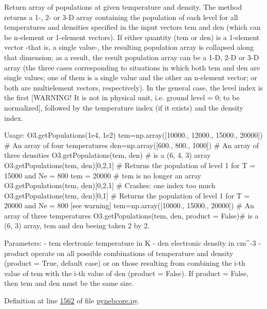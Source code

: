 \begin{DoxyVerb}Return array of populations at given temperature and density.
The method returns a 1-, 2- or 3-D array containing the population of each level 
    for all temperatures and densities specified in the input vectors tem and den 
    (which can be n-element or 1-element vectors).
If either quantity (tem or den) is a 1-element vector -that is, a single value-, 
    the resulting population array is collapsed along that dimension; 
    as a result, the result population array can be a 1-D, 2-D or 3-D array 
    (the three cases corresponding to situations in which both tem and den are single values; 
    one of them is a single value and the other an n-element vector; or both are multielement 
    vectors, respectively). In the general case, the level index is the first 
    [WARNING! It is not in physical unit, i.e. ground level = 0; to be normalized], 
    followed by the temperature index (if it exists) and the density index. 

Usage:
    O3.getPopulations(1e4, 1e2)
    tem=np.array([10000., 12000., 15000., 20000]) # An array of four temperatures
    den=np.array([600., 800., 1000])      # An array of three densities
    O3.getPopulations(tem, den)           # is a (6, 4, 3) array
    O3.getPopulations(tem, den)[0,2,1]    # Returns the population of level 1 for T = 15000 
                                    and Ne = 800
    tem = 20000                           # tem is no longer an array
    O3.getPopulations(tem, den)[0,2,1]  # Crashes: one index too much
    O3.getPopulations(tem, den)[0,1]    # Returns the population of level 1 for T = 20000 
                                    and Ne = 800 [see warning]
    tem=np.array([10000., 15000., 20000]) # An array of three temperatures
    O3.getPopulations(tem, den, product = False)# is a (6, 3) array, tem and den beeing 
                                            taken 2 by 2.

Parameters:
    - tem       electronic temperature in K
    - den       electronic density in cm^-3
    - product   operate on all possible combinations of temperature and density 
      (product = True, default case) or on those resulting from combining 
      the i-th value of tem with the i-th value of den (product = False).
      If product = False, then tem and den must be the same size.\end{DoxyVerb}
 

Definition at line \hyperlink{pynebcore_8py_source_l01562}{1562} of file \hyperlink{pynebcore_8py_source}{pynebcore.\-py}.



